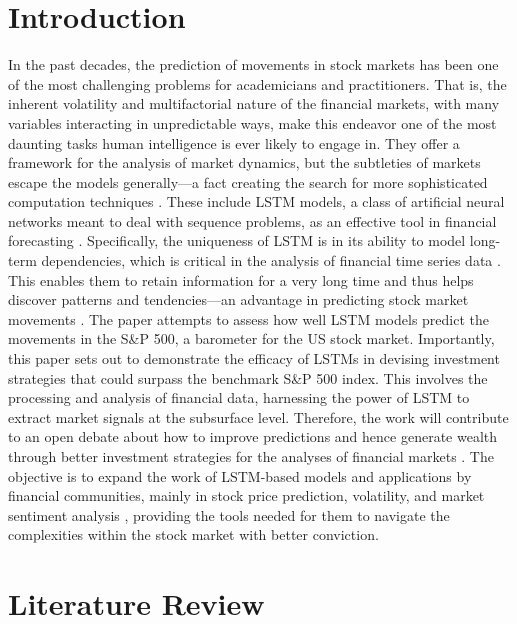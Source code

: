 \documentclass{article}
\begin{document}
\section{Introduction}
In the past decades, the prediction of movements in stock markets has been one of the most challenging problems for academicians and practitioners. That is, the inherent volatility and multifactorial nature of the financial markets, with many variables interacting in unpredictable ways, make this endeavor one of the most daunting tasks human intelligence is ever likely to engage in. They offer a framework for the analysis of market dynamics, but the subtleties of markets escape the models generally---a fact creating the search for more sophisticated computation techniques \cite{lara2021,saivijayalakshmi2021}. These include LSTM models, a class of artificial neural networks meant to deal with sequence problems, as an effective tool in financial forecasting \cite{shukla2023,chen2023}. Specifically, the uniqueness of LSTM is in its ability to model long-term dependencies, which is critical in the analysis of financial time series data \cite{ahmed2022,huang2019}. This enables them to retain information for a very long time and thus helps discover patterns and tendencies---an advantage in predicting stock market movements \cite{nguyen2022,mehra2023}. The paper attempts to assess how well LSTM models predict the movements in the S\&P 500, a barometer for the US stock market. Importantly, this paper sets out to demonstrate the efficacy of LSTMs in devising investment strategies that could surpass the benchmark S\&P 500 index. This involves the processing and analysis of financial data, harnessing the power of LSTM to extract market signals at the subsurface level. Therefore, the work will contribute to an open debate about how to improve predictions and hence generate wealth through better investment strategies for the analyses of financial markets \cite{joshi2022,yusuf2022}. The objective is to expand the work of LSTM-based models and applications by financial communities, mainly in stock price prediction, volatility, and market sentiment analysis \cite{vishwakarma2022,diqi2022,hu2021}, providing the tools needed for them to navigate the complexities within the stock market with better conviction.

\section{Literature Review}
\end{document}
